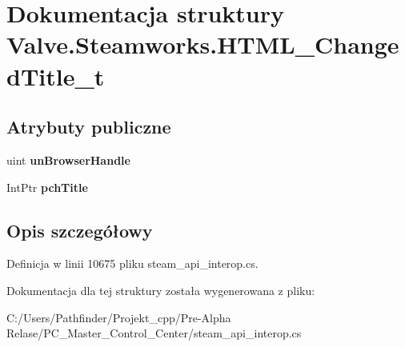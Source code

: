 \hypertarget{struct_valve_1_1_steamworks_1_1_h_t_m_l___changed_title__t}{}\section{Dokumentacja struktury Valve.\+Steamworks.\+H\+T\+M\+L\+\_\+\+Changed\+Title\+\_\+t}
\label{struct_valve_1_1_steamworks_1_1_h_t_m_l___changed_title__t}
\subsection*{Atrybuty publiczne}
\begin{DoxyCompactItemize}
\item 
\mbox{\label{struct_valve_1_1_steamworks_1_1_h_t_m_l___changed_title__t_a736dadb9161137e87c26544111bcb65a}} 
uint {\bfseries un\+Browser\+Handle}
\item 
\mbox{\label{struct_valve_1_1_steamworks_1_1_h_t_m_l___changed_title__t_a504854beb20fe91c400875f5efd2c1d2}} 
Int\+Ptr {\bfseries pch\+Title}
\end{DoxyCompactItemize}


\subsection{Opis szczegółowy}


Definicja w linii 10675 pliku steam\+\_\+api\+\_\+interop.\+cs.



Dokumentacja dla tej struktury została wygenerowana z pliku\+:\begin{DoxyCompactItemize}
\item 
C\+:/\+Users/\+Pathfinder/\+Projekt\+\_\+cpp/\+Pre-\/\+Alpha Relase/\+P\+C\+\_\+\+Master\+\_\+\+Control\+\_\+\+Center/steam\+\_\+api\+\_\+interop.\+cs\end{DoxyCompactItemize}
